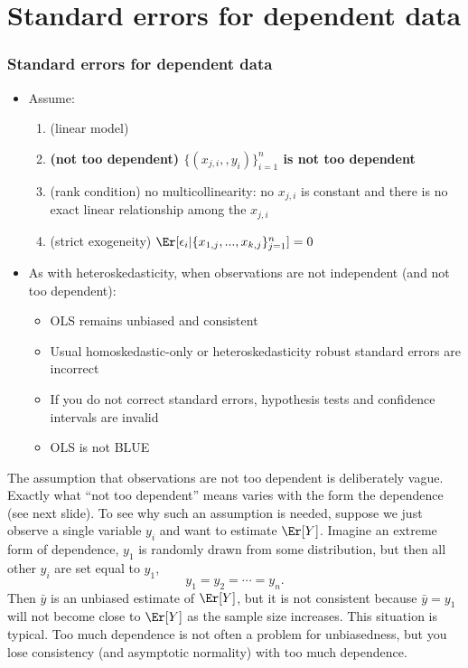 
\section{Standard errors for dependent data}

\begin{frame}[allowframebreaks]
  \frametitle{Standard errors for dependent data}
  \begin{itemize}
  \item Assume:
    \begin{enumerate}
    \item[MLR.1] (linear model) 
    \item[MLR.2] \textbf{(not too dependent) $\{(x_{j,i},,y_i)\}_{i=1}^n$ is
      not too dependent}
    \item[MLR.3] (rank condition) no multicollinearity: no $x_{j,i}$ is
      constant and there is no exact linear relationship among the $x_{j,i}$
    \item[MLR.4] (strict exogeneity) $\Er[\epsilon_i | \{x_{1,j},..., x_{k,j}\}_{j=1}^n] = 0$      
    \end{enumerate}
  \item As with heteroskedasticity, when observations are not
    independent (and not too dependent):
    \begin{itemize}
    \item OLS remains unbiased and consistent
    \item Usual homoskedastic-only or heteroskedasticity robust
      standard errors are incorrect
    \item If you do not correct standard errors, hypothesis tests and
      confidence intervals are invalid
    \item OLS is not BLUE
    \end{itemize}
  \end{itemize}
\end{frame}

The assumption that observations are not too dependent is deliberately
vague. Exactly what ``not too dependent'' means varies with the form
the dependence (see next slide). To see why such an assumption is
needed, suppose we just observe a single variable $y_i$ and want to
estimate $\Er[Y]$. Imagine an extreme form of dependence, $y_1$ is
randomly drawn from some distribution, but then all other $y_i$ are
set equal to $y_1$,
\[ y_1 = y_2 = \cdots = y_n. \]
Then $\bar{y}$ is an unbiased estimate of $\Er[Y]$, but it is not
consistent because $\bar{y} = y_1$ will not become close to $\Er[Y]$
as the sample size increases. This situation is typical. Too much
dependence is not often a problem for unbiasedness, but you lose
consistency (and asymptotic normality) with too much dependence. 

